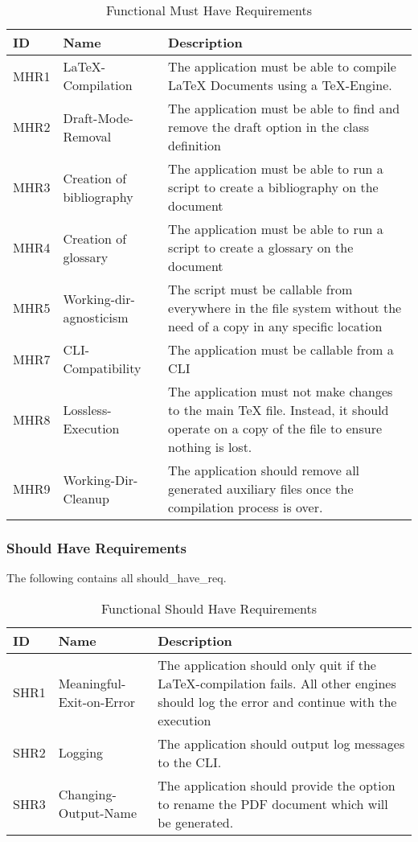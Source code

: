 \begin{table}[!ht]
    \centering
    \begin{tabular}{ | p{} | p{} | p{} | }
        \hline
        \textbf{ID} & \textbf{Name} & \textbf{Description} \\
        \hline
        MHR1 & {\LaTeX}-Compilation & The application must be able to compile {\LaTeX} Documents using a {\TeX}-Engine. \\ \hline
        MHR2 & Draft-Mode-Removal & The application must be able to find and remove the draft option in the class definition \\ \hline
        MHR3 & Creation of bibliography &  The application must be able to run a script to create a bibliography on the document \\ \hline
        MHR4 & Creation of glossary & The application must be able to run a script to create a glossary on the document \\ \hline
        MHR5 & Working-dir-agnosticism & The script must be callable from everywhere in the file system without the need of a copy in any specific location \\ \hline
        MHR7 & CLI-Compatibility & The application must be callable from a CLI \\ \hline
        MHR8 & Lossless-Execution & The application must not make changes to the main {\TeX} file. Instead, it should operate on a copy of the file to ensure nothing is lost. \\ \hline
        MHR9 & Working-Dir-Cleanup& The application should remove all generated auxiliary files once the compilation process is over. \\ \hline
    \end{tabular}
    \caption{Functional Must Have Requirements}
\end{table}

\newpage
\subsubsection{Should Have Requirements}\label{sec:should_have_requirements}
The following contains all \Gls{should_have_req}. 

\begin{table}[!ht]
    \centering
    \begin{tabular}{ | p{} | p{} | p{} | }
        \hline
        \textbf{ID} & \textbf{Name} & \textbf{Description} \\
        \hline
        SHR1 & Meaningful-Exit-on-Error & The application should only quit if the {\LaTeX}-compilation fails. All other engines should log the error and continue with the execution \\ \hline
        SHR2 & Logging & The application should output log messages to the CLI. \\ \hline
        SHR3 & Changing-Output-Name & The application should provide the option to rename the PDF document which will be generated. \\ \hline
    \end{tabular}
    \caption{Functional Should Have Requirements}
\end{table}

